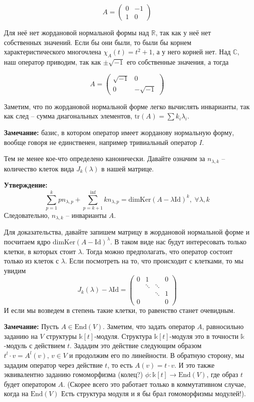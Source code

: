 \documentclass[a4paper, 12pt]{book}
\begin{document}
\[A=\left(\begin{array}{cc}0 & -1\\ 1 & 0\end{array}\right)\]

Для неё нет жордановой нормальной формы над $\mathbb{R}$, так как у неё нет
собственных значений. Если бы они были, то были бы корнем характеристического
многочлена $\chi_A(t)=t^2+1$, а у него корней нет. Над $\mathbb{C}$, наш
оператор приводим, так как $\pm\sqrt{-1}$ его собственные значения, а тогда

\[A=\left(\begin{array}{cc}\sqrt{-1} & 0\\ 0 & -\sqrt{-1}\end{array}\right)\]

Заметим, что по жордановой нормальной форме легко вычислять инварианты, так как
след – сумма диагональных элементов, $\text{tr}(A)=\sum k_i\lambda_i$.

\textbf{Замечание:} базис, в котором оператор имеет жорданову нормальную форму,
вообще говоря не единственен, например тривиальный оператор $I$.

Тем не менее кое-что определено канонически. Давайте означим за $n_{\lambda,k}$
– количество клеток вида $J_k(\lambda)$ в нашей матрице.

\textbf{Утверждение:}
\[\sum_{p=1}^k pn_{\lambda, p}+\sum_{p=k+1}^{\inf}kn_{\lambda, p} =
\text{dimKer}(A-\lambda\text{Id})^k,\;\forall\lambda,k\]
Следовательно, $n_{\lambda, k}$ – инварианты $A$.

Для доказательства, давайте запишем матрицу в жордановой нормальной форме и 
посчитаем ядро $\text{dimKer}(A-\text{Id})^\lambda$. В таком виде нас будут
интересовать только клетки, в которых стоит $\lambda$. Тогда можно предполагать,
что оператор состоит только из клеток с $\lambda$. Если посмотреть на то, что
происходит с клетками, то мы увидим
\[J_k(\lambda)-\lambda\text{Id}=\left(\begin{array}{cccc}
    0 & 1      &        & 0\\
      & \ddots & \ddots & \\
      &        & \ddots & 1\\
    0 &        &        & 0
\end{array}\right)\]
И если мы возведем в степень такие клетки, то равенство станет очевидным.

\textbf{Замечание:} Пусть $A\in\text{End}(V)$. Заметим, что задать оператор $A$,
равносильно заданию на $V$ структуры $\mathbb{k}[t]$-модуля. Структура
$\mathbb{k}[t]$-модуля это в точности $\mathbb{k}$-модуль с действием $t$.
Зададим это действие следующим образом $t^l\cdot v=A^l(v),\,v\in V$ и продолжим
его по линейности. В обратную сторону, мы зададим оператор через действие $t$,
то есть $A(v)=t\cdot v$. И это также эквивалентно заданию гомоморфизма (колец?)
$\phi: \mathbb{k}[t]\rightarrow\text{End}(V)$, где образ $t$ будет оператором
$A$. (Скорее всего это работает только в коммутативном случае, когда на $\text{End}(V)$
Есть структура модуля и я бы брал гомоморфизмы модулей!).
\end{document}
